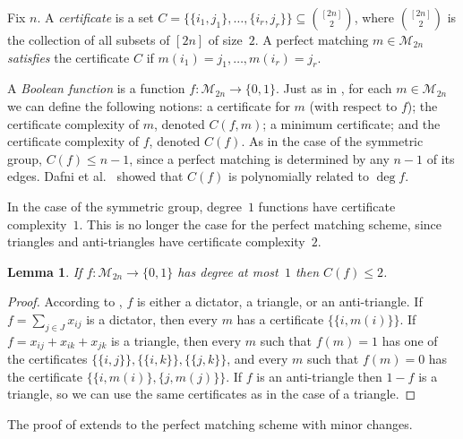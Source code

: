 \documentclass{article}
\newtheorem{lemma}[theorem]{Lemma}
\theoremstyle{definition}
\providecommand{\cM}{\mathcal{M}}
\begin{document}
Fix $n$. A \emph{certificate} is a set $C = \bigl\{ \{i_1,j_1\}, \ldots, \{i_r,j_r\} \bigr\} \subseteq \binom{[2n]}{2}$, where $\binom{[2n]}{2}$ is the collection of all subsets of $[2n]$ of size~$2$. A perfect matching $m \in \cM_{2n}$ \emph{satisfies} the certificate $C$ if $m(i_1) = j_1,\ldots,m(i_r) = j_r$.

A \emph{Boolean function} is a function $f\colon \cM_{2n} \to \{0,1\}$. Just as in , for each $m \in \cM_{2n}$ we can define the following notions: a certificate for $m$ (with respect to $f$); the certificate complexity of $m$, denoted $C(f,m)$; a minimum certificate; and the certificate complexity of $f$, denoted $C(f)$. As in the case of the symmetric group, $C(f) \leq n-1$, since a perfect matching is determined by any $n-1$ of its edges. Dafni et al.~\cite{DFLLV} showed that $C(f)$ is polynomially related to $\deg f$.

In the case of the symmetric group, degree~$1$ functions have certificate complexity~$1$. This is no longer the case for the perfect matching scheme, since triangles and anti-triangles have certificate complexity~$2$. 

\begin{lemma} \label{lem:degree1-cert-pms}
If $f\colon \cM_{2n} \to \{0,1\}$ has degree at most~$1$ then $C(f) \leq 2$.
\end{lemma}
\begin{proof}
According to , $f$ is either a dictator, a triangle, or an anti-triangle. If $f = \sum_{j \in J} x_{ij}$ is a dictator, then every $m$ has a certificate $\bigl\{ \{i,m(i)\} \bigr\}$. If $f = x_{ij} + x_{ik} + x_{jk}$ is a triangle, then every $m$ such that $f(m) = 1$ has one of the certificates $\bigl\{\{i,j\}\bigr\},\bigl\{\{i,k\}\bigr\},\bigl\{\{j,k\}\bigr\}$, and every $m$ such that $f(m) = 0$ has the certificate $\bigl\{\{i,m(i)\},\{j,m(j)\}\bigr\}$. If $f$ is an anti-triangle then $1-f$ is a triangle, so we can use the same certificates as in the case of a triangle.
\end{proof}

The proof of  extends to the perfect matching scheme with minor changes.
\end{document}
